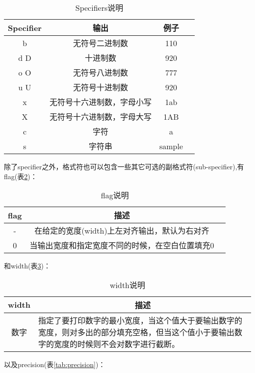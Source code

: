 \begin{table}[h]
  \centering
  \begin{tabular}{cccp{6cm}}
  \toprule
  Specifier & 输出            & 例子\\
  \midrule
  b         & 无符号二进制数       & 110\\
  d D       & 十进制数          & 920\\
  o O       & 无符号八进制数       & 777\\
  u U       & 无符号十进制数       & 920\\
  x         & 无符号十六进制数，字母小写 & 1ab\\
  X         & 无符号十六进制数，字母大写 & 1AB\\
  c         & 字符            & a\\
  s         & 字符串           & sample\\
  \bottomrule
  \end{tabular}
  \caption{Specifiers说明\label{tab:specifiers}}
\end{table}

除了specifier之外，格式符也可以包含一些其它可选的副格式符(sub-specifier),有flag(表\ref{tab:flag})：

\begin{table}[h]
  \centering
  \begin{tabular}{ccp{10cm}}
  \toprule
  flag & 描述\\
  \midrule
  -    & 在给定的宽度(width)上左对齐输出，默认为右对齐\\
  0    & 当输出宽度和指定宽度不同的时候，在空白位置填充0\\
  \bottomrule
  \end{tabular}
  \caption{flag说明\label{tab:flag}}
\end{table}

和width(表\ref{tab:width})：

\begin{table}[h]
  \centering
  \begin{tabular}{cp{10cm}}
  \toprule
  width& \multicolumn{1}{c}{描述}\\
  \midrule
  数字& 指定了要打印数字的最小宽度，当这个值大于要输出数字的宽度，则对多出的部分填充空格，但当这个值小于要输出数字的宽度的时候则不会对数字进行截断。\\
  \bottomrule
  \end{tabular}
  \caption{width说明\label{tab:width}}
\end{table}

以及precision(表\ref{tab:precision})：

